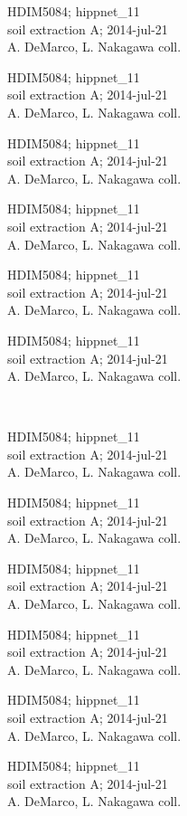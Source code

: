 \documentclass[2pt]{extarticle}
\begin{document}
\noindent
\parbox{0.16\textwidth}{\tiny \raggedright \rule[-0.3\baselineskip]{0pt}{10pt}HDIM5084; hippnet\_11\\ soil extraction A; 2014-jul-21\\ A. DeMarco, L. Nakagawa coll.}
\parbox{0.16\textwidth}{\tiny \raggedright \rule[-0.3\baselineskip]{0pt}{10pt}HDIM5084; hippnet\_11\\ soil extraction A; 2014-jul-21\\ A. DeMarco, L. Nakagawa coll.}
\parbox{0.16\textwidth}{\tiny \raggedright \rule[-0.3\baselineskip]{0pt}{10pt}HDIM5084; hippnet\_11\\ soil extraction A; 2014-jul-21\\ A. DeMarco, L. Nakagawa coll.}
\parbox{0.16\textwidth}{\tiny \raggedright \rule[-0.3\baselineskip]{0pt}{10pt}HDIM5084; hippnet\_11\\ soil extraction A; 2014-jul-21\\ A. DeMarco, L. Nakagawa coll.}
\parbox{0.16\textwidth}{\tiny \raggedright \rule[-0.3\baselineskip]{0pt}{10pt}HDIM5084; hippnet\_11\\ soil extraction A; 2014-jul-21\\ A. DeMarco, L. Nakagawa coll.}
\parbox{0.16\textwidth}{\tiny \raggedright \rule[-0.3\baselineskip]{0pt}{10pt}HDIM5084; hippnet\_11\\ soil extraction A; 2014-jul-21\\ A. DeMarco, L. Nakagawa coll.} \\ 
\vspace{0.001in} 

\noindent
\parbox{0.16\textwidth}{\tiny \raggedright \rule[-0.3\baselineskip]{0pt}{10pt}HDIM5084; hippnet\_11\\ soil extraction A; 2014-jul-21\\ A. DeMarco, L. Nakagawa coll.}
\parbox{0.16\textwidth}{\tiny \raggedright \rule[-0.3\baselineskip]{0pt}{10pt}HDIM5084; hippnet\_11\\ soil extraction A; 2014-jul-21\\ A. DeMarco, L. Nakagawa coll.}
\parbox{0.16\textwidth}{\tiny \raggedright \rule[-0.3\baselineskip]{0pt}{10pt}HDIM5084; hippnet\_11\\ soil extraction A; 2014-jul-21\\ A. DeMarco, L. Nakagawa coll.}
\parbox{0.16\textwidth}{\tiny \raggedright \rule[-0.3\baselineskip]{0pt}{10pt}HDIM5084; hippnet\_11\\ soil extraction A; 2014-jul-21\\ A. DeMarco, L. Nakagawa coll.}
\parbox{0.16\textwidth}{\tiny \raggedright \rule[-0.3\baselineskip]{0pt}{10pt}HDIM5084; hippnet\_11\\ soil extraction A; 2014-jul-21\\ A. DeMarco, L. Nakagawa coll.}
\parbox{0.16\textwidth}{\tiny \raggedright \rule[-0.3\baselineskip]{0pt}{10pt}HDIM5084; hippnet\_11\\ soil extraction A; 2014-jul-21\\ A. DeMarco, L. Nakagawa coll.} \\ 
\vspace{0.001in} 
\end{document}
